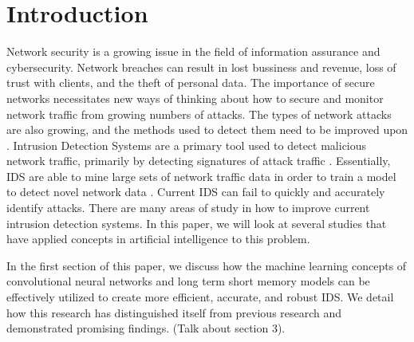 \section{Introduction}

Network security is a growing issue in the field of information assurance and cybersecurity. Network breaches can result in lost bussiness and revenue, loss of trust with clients, and the theft of personal data. The importance of secure networks necessitates new ways of thinking about how to secure and monitor network traffic from growing numbers of attacks. The types of network attacks are also growing, and the methods used to detect them need to be improved upon \cite{yang20}. Intrusion Detection Systems are a primary tool used to detect malicious network traffic, primarily by detecting signatures of attack traffic \cite{nguyen18}. Essentially, IDS are able to mine large sets of network traffic data in order to train a model to detect novel network data \cite{yang20}. Current IDS can fail to quickly and accurately identify attacks. There are many areas of study in how to improve current intrusion detection systems. In this paper, we will look at several studies that have applied concepts in artificial intelligence to this problem. 

In the first section of this paper, we discuss how the machine learning concepts of convolutional neural networks and long term short memory models can be effectively utilized to create more efficient, accurate, and robust IDS. We detail how this research has distinguished itself from previous research and demonstrated promising findings. (Talk about section 3). 

